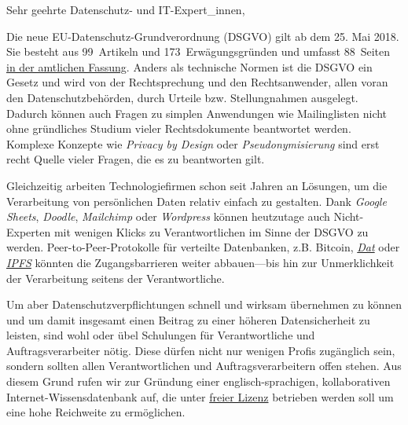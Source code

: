 \documentclass{scrlttr2}
\begin{document}



\begin{letter}{}
\opening{Sehr geehrte Datenschutz- und IT-Expert\_innen,}

Die neue EU-Datenschutz-Grundverordnung (DSGVO) gilt ab dem 25. Mai
2018. Sie besteht aus 99~Artikeln und 173~Erwägungsgründen und umfasst
88~Seiten
\href{http://eur-lex.europa.eu/legal-content/EN/TXT/?uri=uriserv:OJ.L_.2016.119.01.0001.01.ENG}{in
der amtlichen Fassung}. Anders als technische Normen ist die DSGVO ein
Gesetz und wird von der Rechtsprechung und den Rechtsanwender, allen
voran den Datenschutzbehörden, durch Urteile bzw. Stellungnahmen
ausgelegt. Dadurch können auch Fragen zu simplen Anwendungen wie
Mailinglisten nicht ohne gründliches Studium vieler Rechtsdokumente
beantwortet werden. Komplexe Konzepte wie \emph{Privacy by Design} oder
\emph{Pseudonymisierung} sind erst recht Quelle vieler Fragen, die es zu
beantworten gilt.

Gleichzeitig arbeiten Technologiefirmen schon seit Jahren an Lösungen,
um die Verarbeitung von persönlichen Daten relativ einfach zu gestalten.
Dank \emph{Google Sheets}, \emph{Doodle}, \emph{Mailchimp} oder
\emph{Wordpress} können heutzutage auch Nicht-Experten mit wenigen
Klicks zu Verantwortlichen im Sinne der DSGVO zu werden.
Peer-to-Peer-Protokolle für verteilte Datenbanken, z.B. Bitcoin,
\emph{\href{https://datproject.org/}{Dat}} oder
\emph{\href{https://ipfs.io/}{IPFS}} könnten die Zugangsbarrieren weiter
abbauen---bis hin zur Unmerklichkeit der Verarbeitung seitens der
Verantwortliche.

Um aber Datenschutzverpflichtungen schnell und wirksam übernehmen zu
können und um damit insgesamt einen Beitrag zu einer höheren
Datensicherheit zu leisten, sind wohl oder übel Schulungen für
Verantwortliche und Auftragsverarbeiter nötig. Diese dürfen nicht nur
wenigen Profis zugänglich sein, sondern sollten allen Verantwortlichen
und Auftragsverarbeitern offen stehen. Aus diesem Grund rufen wir zur
Gründung einer englisch-sprachigen, kollaborativen
Internet-Wissensdatenbank auf, die unter
\href{https://creativecommons.org/}{freier Lizenz} betrieben werden soll
um eine hohe Reichweite zu ermöglichen.


\end{letter}
\end{document}
